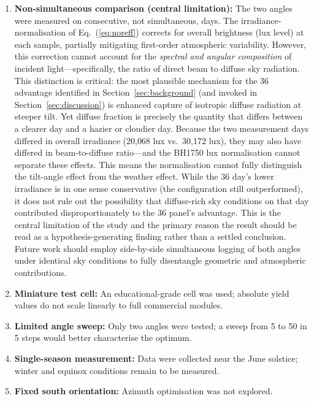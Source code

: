 \documentclass[conference]{IEEEtran}
\begin{document}
\begin{enumerate}
  \item \textbf{Non-simultaneous comparison (central limitation):} The two angles were
        measured on consecutive, not simultaneous, days. The irradiance-normalisation of
        Eq.~(\ref{eq:noreff}) corrects for overall brightness (lux level) at each sample,
        partially mitigating first-order atmospheric variability. However, this correction
        cannot account for the \textit{spectral and angular composition} of incident
        light---specifically, the ratio of direct beam to diffuse sky radiation. This
        distinction is critical: the most plausible mechanism for the 36\degree{} advantage
        identified in Section~\ref{sec:background} (and invoked in
        Section~\ref{sec:discussion}) is enhanced capture of isotropic diffuse radiation at
        steeper tilt. Yet diffuse fraction is precisely the quantity that differs between a
        clearer day and a hazier or cloudier day. Because the two measurement days differed
        in overall irradiance (20{,}068 lux vs.\ 30{,}172 lux), they may also have differed
        in beam-to-diffuse ratio---and the BH1750 lux normalisation cannot separate these
        effects. This means the normalisation cannot fully distinguish the tilt-angle effect
        from the weather effect. While the 36\degree{} day's lower irradiance is in one
        sense conservative (the configuration still outperformed), it does not rule out the
        possibility that diffuse-rich sky conditions on that day contributed
        disproportionately to the 36\degree{} panel's advantage. This is the central
        limitation of the study and the primary reason the result should be read as a
        hypothesis-generating finding rather than a settled conclusion. Future work should
        employ side-by-side simultaneous logging of both angles under identical sky
        conditions to fully disentangle geometric and atmospheric contributions.
  \item \textbf{Miniature test cell:} An educational-grade cell was used; absolute yield
        values do not scale linearly to full commercial modules.
  \item \textbf{Limited angle sweep:} Only two angles were tested; a sweep from 5\degree{} to
        50\degree{} in 5\degree{} steps would better characterise the optimum.
  \item \textbf{Single-season measurement:} Data were collected near the June solstice; winter
        and equinox conditions remain to be measured.
  \item \textbf{Fixed south orientation:} Azimuth optimisation was not explored.
\end{enumerate}
\end{document}
